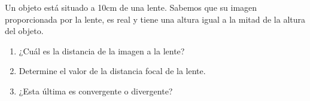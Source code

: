 
Un objeto está situado a 10cm de una lente. Sabemos que su imagen proporcionada por la lente, es real y tiene una altura igual a la mitad de la altura del objeto.
\begin{enumerate}
    \item ¿Cuál es la distancia de la imagen a la lente?
    \item Determine el valor de la distancia focal de la lente.
    \item ¿Esta última es convergente o divergente?
\end{enumerate}